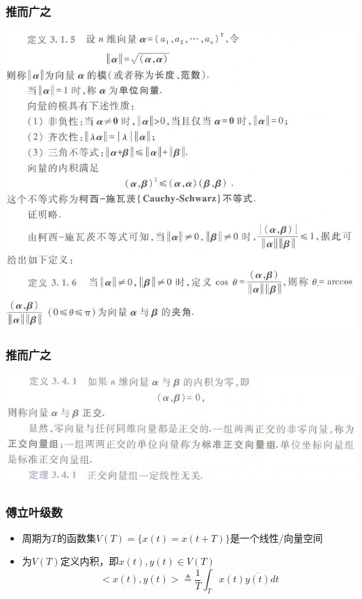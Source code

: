 \documentclass[CJKutf8,xcolor=pdftex,dvipsnames,table]{beamer}
\begin{document}
\begin{CJK*}{UTF8}{song}
\begin{frame}
\begin{center}
    \end{center}
  \end{frame}   

  \begin{frame}
    \frametitle{推而广之}
    \begin{center}
      \includegraphics[scale=.35]{cqu-la-def-3-1-5}

    \end{center}
  \end{frame}   


  \begin{frame}
    \frametitle{推而广之}
    \begin{center}
      \includegraphics[scale=.5]{cqu-la-def-3-4-1}

    \end{center}
  \end{frame}   

  
  \begin{frame}
    \frametitle{傅立叶级数}
    \begin{itemize}
	\item 周期为$T$的函数集$V(T)=\{x(t)=x(t+T)\}$是一个线性/向量空间
	\item 为$V(T)$定义内积，即$x(t), y(t) \in V(T)$
	\[ 
	<x(t), y(t)> \triangleq \frac{1}{T}\int_T x(t) \overline{y(t)} dt
	\]
	

\end{itemize}
\end{frame}
\end{CJK*}
\end{document}
